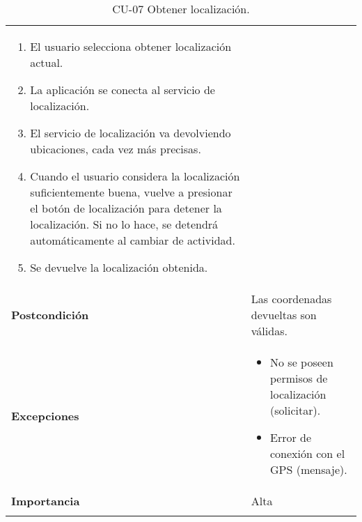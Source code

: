 \begin{longtable}[H]{@{}ll@{}}
\begin{minipage}[t]{0.68\columnwidth}
\begin{enumerate}
\def\labelenumi{\arabic{enumi}.}
\tightlist
\item
  El usuario selecciona obtener localización actual.
\item
  La aplicación se conecta al servicio de localización.
\item
  El servicio de localización va devolviendo ubicaciones, cada vez más
  precisas.
\item
  Cuando el usuario considera la localización suficientemente buena,
  vuelve a presionar el botón de localización para detener la
  localización. Si no lo hace, se detendrá automáticamente al cambiar de
  actividad.
\item
  Se devuelve la localización obtenida.
\end{enumerate}\strut
\end{minipage}\tabularnewline
\begin{minipage}[t]{0.26\columnwidth}\raggedright\strut
\textbf{Postcondición}\strut
\end{minipage} & \begin{minipage}[t]{0.68\columnwidth}\raggedright\strut
Las coordenadas devueltas son válidas.\strut
\end{minipage}\tabularnewline
\begin{minipage}[t]{0.26\columnwidth}\raggedright\strut
\textbf{Excepciones}\strut
\end{minipage} & \begin{minipage}[t]{0.68\columnwidth}\raggedright\strut
\begin{itemize}
\tightlist
\item
  No se poseen permisos de localización (solicitar).
\item
  Error de conexión con el GPS (mensaje).
\end{itemize}\strut
\end{minipage}\tabularnewline
\begin{minipage}[t]{0.26\columnwidth}\raggedright\strut
\textbf{Importancia}\strut
\end{minipage} & \begin{minipage}[t]{0.68\columnwidth}\raggedright\strut
Alta\strut
\end{minipage}\tabularnewline
\bottomrule
\caption{CU-07 Obtener localización.}
\end{longtable}

